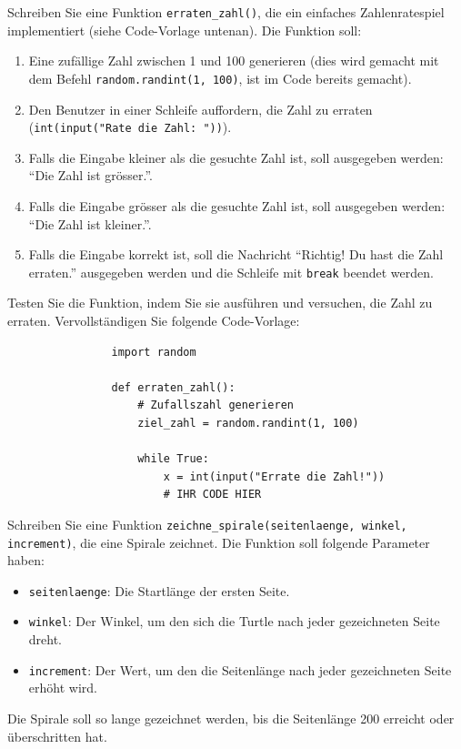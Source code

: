 \begin{myexercise}
	Schreiben Sie eine Funktion \lstinline|erraten_zahl()|, die ein einfaches Zahlenratespiel implementiert (siehe Code-Vorlage untenan). Die Funktion soll:
	\begin{enumerate}
		\item Eine zufällige Zahl zwischen 1 und 100 generieren (dies wird gemacht mit dem Befehl \lstinline|random.randint(1, 100)|, ist im Code bereits gemacht).
		\item Den Benutzer in einer Schleife auffordern, die Zahl zu erraten (\lstinline|int(input("Rate die Zahl: "))|).
		\item Falls die Eingabe kleiner als die gesuchte Zahl ist, soll ausgegeben werden: \enquote{Die Zahl ist grösser.}.
		\item Falls die Eingabe grösser als die gesuchte Zahl ist, soll ausgegeben werden: \enquote{Die Zahl ist kleiner.}.
		\item Falls die Eingabe korrekt ist, soll die Nachricht \enquote{Richtig! Du hast die Zahl erraten.} ausgegeben werden und die Schleife mit \lstinline|break| beendet werden.
	\end{enumerate}
	Testen Sie die Funktion, indem Sie sie ausführen und versuchen, die Zahl zu erraten.
	Vervollständigen Sie folgende Code-Vorlage:
	\begin{lstlisting}
				import random
				
				def erraten_zahl():
					# Zufallszahl generieren
					ziel_zahl = random.randint(1, 100)
					
					while True:
						x = int(input("Errate die Zahl!"))
						# IHR CODE HIER
		\end{lstlisting}
	\begin{myanswer}
		
	\end{myanswer}
\end{myexercise}

\begin{myexercise}
	Schreiben Sie eine Funktion \lstinline|zeichne_spirale(seitenlaenge, winkel, increment)|, die eine Spirale zeichnet. Die Funktion soll folgende Parameter haben:
	\begin{itemize}
		\item \lstinline|seitenlaenge|: Die Startlänge der ersten Seite.
		\item \lstinline|winkel|: Der Winkel, um den sich die Turtle nach jeder gezeichneten Seite dreht.
		\item \lstinline|increment|: Der Wert, um den die Seitenlänge nach jeder gezeichneten Seite erhöht wird.
	\end{itemize}
	Die Spirale soll so lange gezeichnet werden, bis die Seitenlänge 200 erreicht oder überschritten hat.

	\begin{myanswer}
		
	\end{myanswer}
\end{myexercise}


